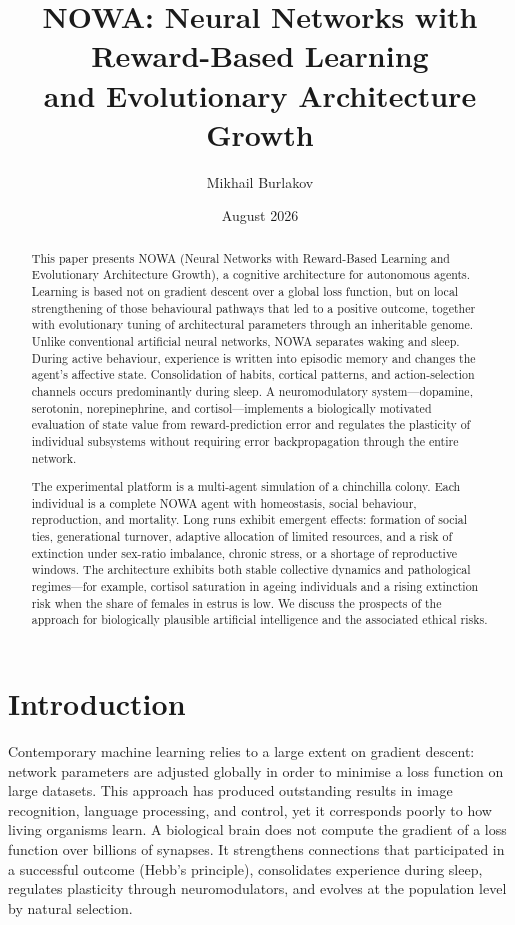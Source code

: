 \documentclass[11pt,a4paper]{article}
\title{NOWA: Neural Networks with Reward-Based Learning\\
and Evolutionary Architecture Growth}
\author{Mikhail Burlakov}
\date{August 2026}
\begin{document}
\maketitle

\begin{abstract}
This paper presents NOWA (Neural Networks with Reward-Based Learning and Evolutionary Architecture Growth), a cognitive architecture for autonomous agents. Learning is based not on gradient descent over a global loss function, but on local strengthening of those behavioural pathways that led to a positive outcome, together with evolutionary tuning of architectural parameters through an inheritable genome. Unlike conventional artificial neural networks, NOWA separates waking and sleep. During active behaviour, experience is written into episodic memory and changes the agent's affective state. Consolidation of habits, cortical patterns, and action-selection channels occurs predominantly during sleep. A neuromodulatory system---dopamine, serotonin, norepinephrine, and cortisol---implements a biologically motivated evaluation of state value from reward-prediction error and regulates the plasticity of individual subsystems without requiring error backpropagation through the entire network.

The experimental platform is a multi-agent simulation of a chinchilla colony. Each individual is a complete NOWA agent with homeostasis, social behaviour, reproduction, and mortality. Long runs exhibit emergent effects: formation of social ties, generational turnover, adaptive allocation of limited resources, and a risk of extinction under sex-ratio imbalance, chronic stress, or a shortage of reproductive windows. The architecture exhibits both stable collective dynamics and pathological regimes---for example, cortisol saturation in ageing individuals and a rising extinction risk when the share of females in estrus is low. We discuss the prospects of the approach for biologically plausible artificial intelligence and the associated ethical risks.
\end{abstract}

\section{Introduction}

Contemporary machine learning relies to a large extent on gradient descent: network parameters are adjusted globally in order to minimise a loss function on large datasets. This approach has produced outstanding results in image recognition, language processing, and control, yet it corresponds poorly to how living organisms learn. A biological brain does not compute the gradient of a loss function over billions of synapses. It strengthens connections that participated in a successful outcome (Hebb's principle), consolidates experience during sleep, regulates plasticity through neuromodulators, and evolves at the population level by natural selection.
\end{document}
